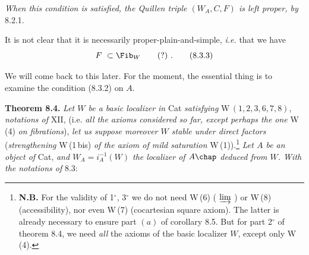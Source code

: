 \textit{When this condition is satisfied, the Quillen triple $(W_A,C,F)$ is left proper, by} 8.2.1.

It is not clear that it is necessarily proper-plain-and-simple, \textit{i.e.} that we have
\[
F\ \subset \Fib_W \qquad (?)\ .
\tag*{(8.3.3)}
\]

We will come back to this later. For the moment, the essential thing is to examine the condition (8.3.2) on $A$.

\textbf{Theorem 8.4.} \textit{Let $W$ be a basic localizer in} Cat \textit{satisfying} $\mathrm{W}\,(1,2,3,6,7,8)$, \textit{notations of} XII, (i.e. \textit{all the axioms considered so far, except perhaps the one} W\,(4) \textit{on fibrations}), \textit{let us suppose moreover $W$ stable under direct factors} (\textit{strengthening} W\,(1\,bis) \textit{of the axiom of mild saturation} W\,(1)).\footnote[37]{\textbf{N.B.} For the validity of 1$^\circ$, 3$^\circ$ we do not need W\,(6) ( $\varinjlim$ ) or W\,(8) (accessibility), nor even W\,(7) (cocartesian square axiom). The latter is already necessary to ensure part $(a)$ of corollary 8.5. But for part 2$^\circ$ of theorem 8.4, we need \textit{all} the axioms of the basic localizer $W$, except only W\,(4).} \textit{Let $A$ be an object of} Cat, \textit{and $W_A=i_A^{-1}(W)$ the localizer of $A\chap$ deduced from $W$. With the notations of} 8.3:
